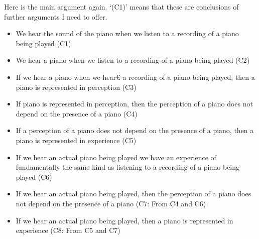 \documentclass[sloppy, journal, git, bytitle, dodraft]{humapap}
\begin{document}
Here is the main argument again. `(C1)' means that these are conclusions of further arguments I need to offer.

\begin{itemize}
	\item We hear the sound of the piano when we listen to a recording of a piano being played (C1)
	\item We hear a piano when we listen to a recording of a piano being played (C2)
	\item If we hear a piano when we hear€ a recording of a piano being played, then a piano is represented in perception (C3)
	\item If piano is represented in perception, then the perception of a piano does not depend on the presence of a piano (C4) 
	\item If a perception of a piano does not depend on the presence of a piano, then a piano is represented in experience (C5)
	\item If we hear an actual piano being played we have an experience of fundamentally the same kind as listening to a recording of a piano being played (C6)
	\item If we hear an actual piano being played, then the perception of a piano does not depend on the presence of a piano (C7: From C4 and C6)
	\item If we hear an actual piano being played, then a piano is represented in experience (C8: From C5 and C7)
\end{itemize}

\printbibliography
\end{document}
